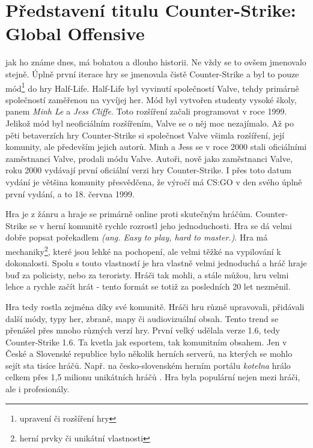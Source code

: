 \section{Představení titulu Counter-Strike: Global Offensive}
 jak ho známe dnes, má bohatou a dlouho historii. Ne vždy se to ovšem jmenovalo stejně. Úplně první iterace hry se jmenovala čistě Counter-Strike a byl to pouze mód\footnote{upravení či rozšíření hry} do
hry Half-Life. Half-Life byl vyvinutí společností Valve, tehdy primárně společností zaměřenou na vyvíjej her. Mód byl vytvořen studenty vysoké školy, panem \textit{Minh Le} a \textit{Jess Cliffe}. Toto rozšíření začali programovat
v roce 1999. Jelikož mód byl neoficiálním rozšířením, Valve se o něj moc nezajímalo. Až po pěti betaverzích hry Counter-Strike si společnost Valve všimla rozšíření, její komunity, ale především jejich autorů. Minh a Jess
se v roce 2000 stali oficiálními zaměstnanci Valve, prodali  módu Valve. Autoři, nově jako zaměstnanci Valve, roku 2000 vydávají první oficiální verzi hry Counter-Strike. I přes toto 
datum vydání je většina komunity přesvědčena, že výročí má \ac{CS:GO} v den svého úplně první vydání, a to 18. června 1999.

Hra je z žánru  a hraje se primárně online proti skutečným hráčům. Counter-Strike se v herní komunitě rychle rozrostl jeho jednoduchosti. Hra se dá velmi dobře popsat pořekadlem
\textit{ (ang. Easy to play, hard to master.)}. Hra má mechaniky\footnote{herní prvky či unikátní vlastnosti}, které jsou lehké na pochopení, ale velmi těžké na vypilování k dokonalosti.
Spolu s touto vlastností je hra vlastně velmi jednoduchá a hráč hraje buď za policisty, nebo za teroristy. Hráči tak mohli, a stále můžou, hru velmi lehce a rychle začít hrát - tento formát se totiž za posledních 20 let nezměnil. 

Hra tedy rostla zejména díky své komunitě. Hráči hru různě upravovali, přidávali další módy, typy her, zbraně, mapy či audiovizuální obsah. Tento trend se přenášel přes mnoho různých verzí hry. První velký  udělala
verze 1.6, tedy Counter-Strike 1.6. Ta kvetla jak esportem, tak komunitním obsahem. Jen v České a Slovenské republice bylo několik herních serverů, na kterých se mohlo sejít sta tisíce hráčů. Např. na česko-slovenském 
herním portálu \textit{kotelna} hrálo celkem přes 1,5 milionu unikátních hráčů \cite{csko2021}. Hra byla populární nejen mezi  hráči, ale i profesionály.


